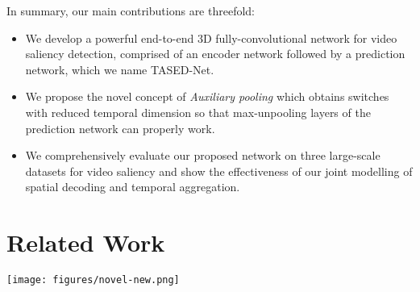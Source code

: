 \documentclass[10pt,twocolumn,letterpaper]{article}
\newcommand{\modelname}{TASED-Net}
\newcommand{\auxpnamet}{Auxiliary pooling}
\newcommand{\auxpname}{\textit{\auxpnamet}}
\begin{document}
In summary, our main contributions are threefold:
\begin{itemize}[noitemsep,nolistsep,before=\vspace{4pt}, after=\vspace{4pt}]
   \item We develop a powerful end-to-end 3D fully-convolutional network for video saliency detection, comprised of an encoder network followed by a prediction network, which we name \modelname{}.
   \item We propose the novel concept of \auxpname{} which obtains switches with reduced temporal dimension so that max-unpooling layers of the prediction network can properly work.
   \item We comprehensively evaluate our proposed network on three large-scale datasets for video saliency and show the effectiveness of our joint modelling of spatial decoding and temporal aggregation.
\end{itemize}
 
\section{Related Work} \label{sec:related}

\begin{figure*}[ht]
  \centering
  \texttt{[image: figures/novel-new.png]}
  \caption{A detailed illustration of our proposed \modelname{} architecture. Violet boxes are convolutional operation blocks taken from the S3D~\cite{xie2018rethinking} network pre-trained on the Kinetics dataset~\cite{kay2017kinetics}. Pink boxes represent spatial decoding blocks. Green boxes are temporal convolutions that reduce the temporal dimension; within these blocks, $p$ and $q$ are set to reduce the temporal size of the output to 1. The $1\times 1\times 1$ convolutional operation in orange re-distributes the channel information of the encoded features. Because the unpooling layers operate only in spatial dimensions, switches~\cite{zeiler2011adaptive} from the pooling layers cannot be reused. \auxpname{\textit{s}} are used as extra poolings to obtain properly-sized switches for the unpooling layers. Dashed arrows represent switch transfer. Note that \auxpname{\textit{s}} are not included in the main data stream.}
  \label{fig:novel}
\end{figure*}
\end{document}
